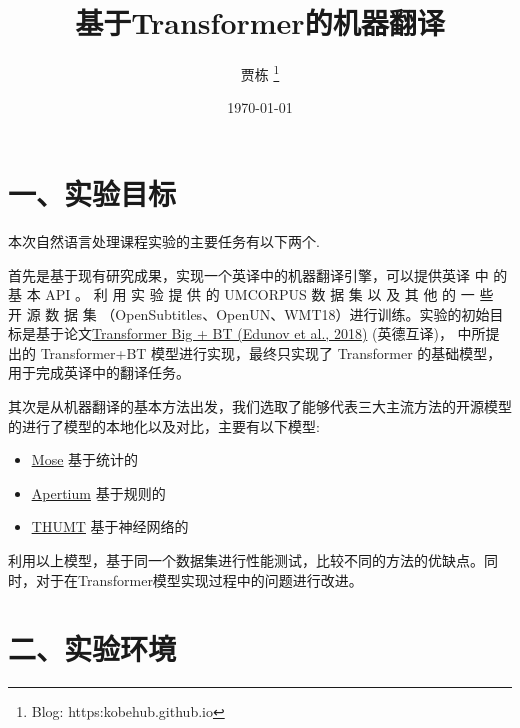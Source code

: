 \documentclass[UTF8,a4paper,10pt]{ctexart}
\title{\textbf{基于Transformer的机器翻译}}
\author{ 贾栋 \thanks{Blog: https:kobehub.github.io} }
\date{\today}
\begin{document}

\maketitle
 

 
 
\section*{一、实验目标}
本次自然语言处理课程实验的主要任务有以下两个.

首先是基于现有研究成果，实现一个英译中的机器翻译引擎，可以提供英译
中 的 基 本 API 。 利 用 实 验 提 供 的 UMCORPUS 数 据 集 以 及 其 他 的 一 些 开 源 数 据 集
（OpenSubtitles、OpenUN、WMT18）进行训练。实验的初始目标是基于论文\href{https://arxiv.org/pdf/1808.09381.pdf}{\color{blue}Transformer Big + BT (Edunov et al., 2018)} (英德互译)，
中所提出的 Transformer+BT 模型进行实现，最终只实现了
Transformer 的基础模型，用于完成英译中的翻译任务。

其次是从机器翻译的基本方法出发，我们选取了能够代表三大主流方法的开源模型的进行了模型的本地化以及对比，主要有以下模型:

\begin{itemize}

\item[$$$\bullet$] \href{http://www.statmt.org/moses/?n=Moses.Overview}{\color{blue}\underline{Mose}}  基于统计的 

\item[$\bullet$] \href{https://github.com/apertium}{\color{blue}\underline{Apertium}}                基于规则的

\item[$\bullet$] \href{http://thumt.thunlp.org/}{\color{blue}\underline{THUMT}}                     基于神经网络的
\end{itemize}
 
 利用以上模型，基于同一个数据集进行性能测试，比较不同的方法的优缺点。同时，对于在Transformer模型实现过程中的问题进行改进。
\setcounter{section}{2}
 \section*{二、实验环境}
\end{document}
